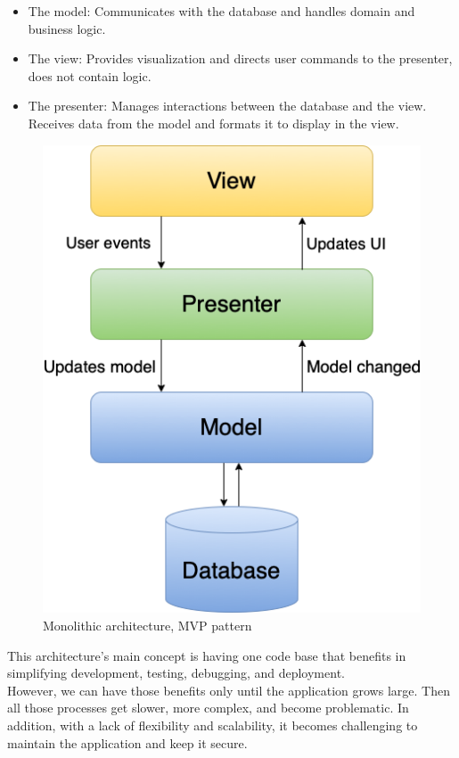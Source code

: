 \begin{itemize}
  \item The model: Communicates with the database and handles domain and business logic.
  \item The view: Provides visualization and directs user commands to the presenter, does not contain logic.
  \item The presenter: Manages interactions between the database and the view. Receives data from the model and formats it to display in the view.
\end{itemize}

\begin{figure}[hp]
\centering
\includegraphics[scale=0.5]{../png/mvp_monolithic.png}
\caption{Monolithic architecture, MVP pattern}\label{picture:mvp}
\end{figure}

\noindent
This architecture's main concept is having one code base that benefits in \\simplifying development, testing, debugging, and deployment. \\
However, we can have those benefits only until the application grows large. Then all those processes get slower, more complex, and become problematic. In addition, with a lack of flexibility and scalability, it becomes challenging to maintain the application and keep it secure. \\


